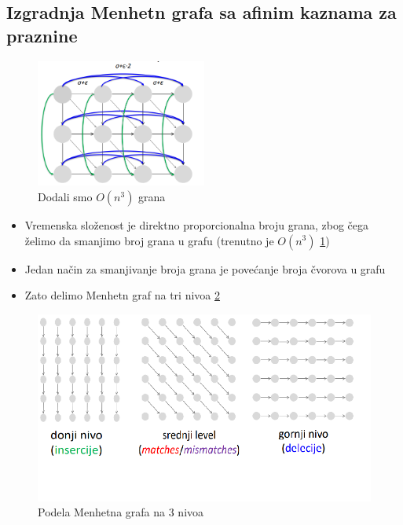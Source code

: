 \subsection{Izgradnja Menhetn grafa sa afinim kaznama za praznine}

\begin{figure}[]
\centering
\includegraphics[width=0.5\textwidth]{poglavlja/5/slike/MenhettnAifnePraznine.png}
\caption{Dodali smo $O(n^3)$ grana}
\label{slika:afiniMenhetn}
\end{figure}


\begin{itemize}
    \item Vremenska složenost je direktno proporcionalna broju grana, zbog čega želimo da smanjimo broj grana u grafu (trenutno je
$O(n^3)$ \ref{slika:afiniMenhetn})
\item Jedan način za smanjivanje broja grana je povećanje broja čvorova u grafu
\item Zato delimo Menhetn graf na tri nivoa \ref{slika:triNivoa}
\end{itemize}


\begin{figure}[]
\centering
\includegraphics[width=\textwidth]{poglavlja/5/slike/triNivoa.png}
\caption{Podela Menhetna grafa na 3 nivoa}
\label{slika:triNivoa}
\end{figure}

